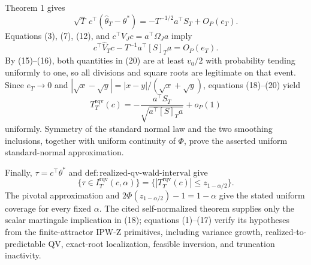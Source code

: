 Theorem 1 gives
\[
 \sqrt T\,c^\top(\widehat\theta_T-\theta^*)
 =-T^{-1/2}a^\top S_T+O_P(e_T). \tag{19}
\]
Equations (3), (7), (12), and \(c^\top V_Jc=a^\top\Omega_Ja\) imply
\[
 c^\top\widehat V_Tc-T^{-1}a^\top[S]_Ta=O_P(e_T). \tag{20}
\]
By (15)--(16), both quantities in (20) are at least \(v_0/2\) with probability tending uniformly to one, so all divisions and square roots are legitimate on that event. Since \(e_T\to0\) and \(|\sqrt x-\sqrt y|=|x-y|/(\sqrt x+\sqrt y)\), equations (18)--(20) yield
\[
 T_T^{\mathrm{rqv}}(c)
 =-\frac{a^\top S_T}{\sqrt{a^\top[S]_Ta}}+o_P(1) \tag{21}
\]
uniformly. Symmetry of the standard normal law and the two smoothing inclusions, together with uniform continuity of \(\Phi\), prove the asserted uniform standard-normal approximation.

Finally, \(\tau=c^\top\theta^*\) and \(\mathrm{def:realized\text{-}qv\text{-}wald\text{-}interval}\) give
\[
 \{\tau\in I_T^{\mathrm{rqv}}(c,\alpha)\}
 =\{|T_T^{\mathrm{rqv}}(c)|\le z_{1-\alpha/2}\}. \tag{22}
\]
The pivotal approximation and \(2\Phi(z_{1-\alpha/2})-1=1-\alpha\) give the stated uniform coverage for every fixed \(\alpha\). The cited self-normalized theorem supplies only the scalar martingale implication in (18); equations (1)--(17) verify its hypotheses from the finite-attractor IPW-Z primitives, including variance growth, realized-to-predictable QV, exact-root localization, feasible inversion, and truncation inactivity.